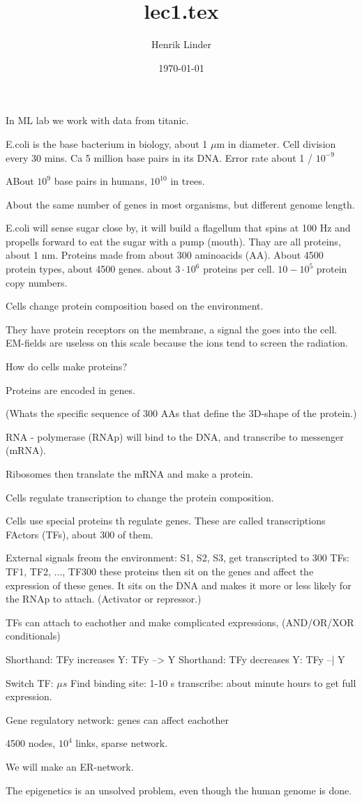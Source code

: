 \documentclass{article}
\title{lec1.tex }
\author{Henrik Linder}
\date{\today}
\begin{document}
\maketitle



In ML lab we work with data from titanic.

E.coli is the base bacterium in biology, about 1 $\mu$m in diameter. Cell division every 30 mins. Ca 5 million base pairs in its DNA. Error rate about 1 / $10 ^{-9}$

ABout $10 ^{9}$ base pairs in humans, $10 ^{10}$ in trees. 

About the same number of genes in most organisms, but different genome length. 


E.coli will sense sugar close by, it will build a flagellum that spins at 100 Hz and propells forward to eat the sugar with a pump (mouth). Thay are all proteins, about 1 nm. Proteins made from about 300 aminoacids (AA). About 4500 protein types, about 4500 genes. 
about $3\cdot 10^{6}$ proteins per cell. 
$10 - 10^{5}$ protein copy numbers. 

Cells change protein composition based on the environment. 

They have protein receptors on the membrane, a signal the goes into the cell. EM-fields are useless on this scale because the ions tend to screen the radiation.

How do cells make proteins? 

Proteins are encoded in genes. 

(Whats the specific sequence of 300 AAs that define the 3D-shape of the protein.)


RNA - polymerase (RNAp) will bind to the DNA, and transcribe to messenger (mRNA). 

Ribosomes then translate the mRNA and make a protein. 

Cells regulate transcription to change the protein composition.

Cells use special proteins th regulate genes. These are called transcriptions FActors (TFs), about 300 of them. 

External signals freom the environment: S1, S2, S3, get transcripted to 300 TFs: TF1, TF2, ..., TF300 
these proteins then sit on the genes and affect the expression of these genes. It sits on the DNA and makes it more or less likely for the RNAp to attach. (Activator or repressor.)

TFs can attach to eachother and make complicated expressions, (AND/OR/XOR conditionals)

Shorthand: TFy increases Y: TFy --> Y 
Shorthand: TFy decreases Y: TFy --| Y 

Switch TF: $\mu s$
Find binding site: 1-10 s 
transcribe: about minute
hours to get full expression. 

Gene regulatory network: genes can affect eachother

4500 nodes, $10^{4}$ links, sparse network. 

We will make an ER-network.		

The epigenetics is an unsolved problem, even though the human genome is done. 
\end{document}
